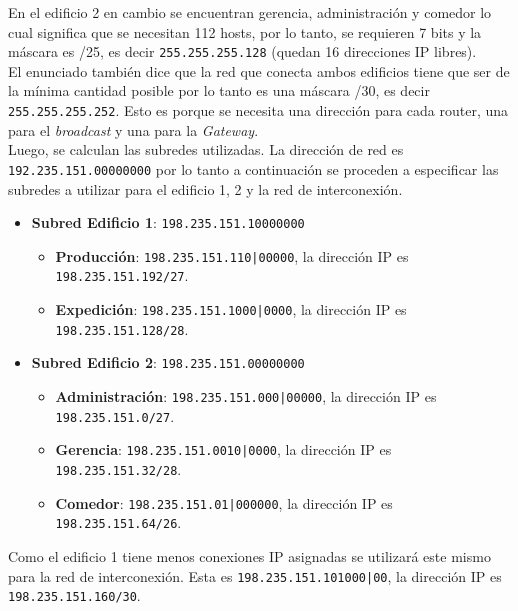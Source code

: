 En el edificio 2 en cambio se encuentran gerencia, administración y comedor lo cual significa que se necesitan 112 hosts, por lo tanto, se requieren 7 bits y la máscara es /25, es decir \texttt{255.255.255.128} (quedan 16 direcciones IP libres).\\

El enunciado también dice que la red que conecta ambos edificios tiene que ser de la mínima cantidad posible por lo tanto es una máscara /30, es decir \texttt{255.255.255.252}. Esto es porque se necesita una dirección para cada router, una para el \textit{broadcast} y una para la \textit{Gateway}. \\

Luego, se calculan las subredes utilizadas. La dirección de red es \texttt{192.235.151.00000000} por lo tanto a continuación se proceden a especificar las subredes a utilizar para el edificio 1, 2 y la red de interconexión.\\

\begin{itemize}
    \item \textbf{Subred Edificio 1}: \texttt{198.235.151.10000000} 
    \begin{itemize}
        \item \textbf{Producción}: \texttt{198.235.151.110|00000}, la dirección IP es \texttt{198.235.151.192/27}.
        \item \textbf{Expedición}: \texttt{198.235.151.1000|0000}, la dirección IP es \texttt{198.235.151.128/28}.
    \end{itemize}
    \item \textbf{Subred Edificio 2}: \texttt{198.235.151.00000000} 
    \begin{itemize}
        \item \textbf{Administración}: \texttt{198.235.151.000|00000}, la dirección IP es \texttt{198.235.151.0/27}.
        \item \textbf{Gerencia}: \texttt{198.235.151.0010|0000}, la dirección IP es \texttt{198.235.151.32/28}.
        \item \textbf{Comedor}: \texttt{198.235.151.01|000000}, la dirección IP es \texttt{198.235.151.64/26}.
    \end{itemize}
\end{itemize}

Como el edificio 1 tiene menos conexiones IP asignadas se utilizará este mismo para la red de interconexión. Esta es \texttt{198.235.151.101000|00}, la dirección IP es \texttt{198.235.151.160/30}.\\

